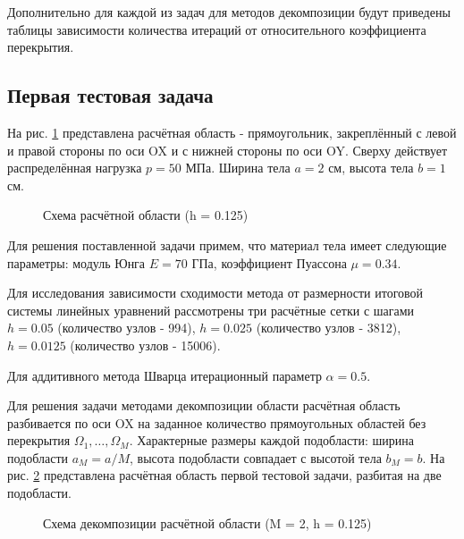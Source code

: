 \documentclass[a4paper]{article}
\newcommand{\area}{rectangle}
\newcommand{\task}{3_fixes}
\newcommand{\taskNum}{01}
\begin{document}
Дополнительно для каждой из задач для методов декомпозиции будут приведены таблицы зависимости количества итераций от относительного коэффициента перекрытия.

\newpage

\subsection{Первая тестовая задача}

На рис. \ref{fig:task_\taskNum_scheme} представлена расчётная область - прямоугольник, закреплённый с левой и правой стороны по оси OX и с нижней стороны по оси OY. Сверху действует распределённая нагрузка $p = 50$ МПа. Ширина тела $a = 2$ см, высота тела $b = 1$ см.

\begin{figure}[h]
\caption{Схема расчётной области (h = 0.125)}
\label{fig:task_\taskNum_scheme}
\end{figure}

Для решения поставленной задачи примем, что материал тела имеет следующие параметры: модуль Юнга $E = 70$ ГПа, коэффициент Пуассона $\mu = 0.34$. 

Для исследования зависимости сходимости метода от размерности итоговой системы линейных уравнений рассмотрены три расчётные сетки с шагами $h = 0.05$ (количество узлов - 994), $h = 0.025$ (количество узлов - 3812), $h = 0.0125$ (количество узлов - 15006).

Для аддитивного метода Шварца итерационный параметр $\alpha = 0.5$.

\newpage

Для решения задачи методами декомпозиции области расчётная область разбивается по оси OX на заданное количество прямоугольных областей без перекрытия $\Omega_1, \ldots, \Omega_M$. Характерные размеры каждой подобласти: ширина подобласти $a_M = a / M$, высота подобласти совпадает с высотой тела $b_M = b$. На рис. \ref{fig:task_\taskNum_decomposition} представлена расчётная область первой тестовой задачи, разбитая на две подобласти.

\begin{figure}[h]
\caption{Схема декомпозиции расчётной области (M = 2, h = 0.125)}
\label{fig:task_\taskNum_decomposition}
\end{figure}
\end{document}
